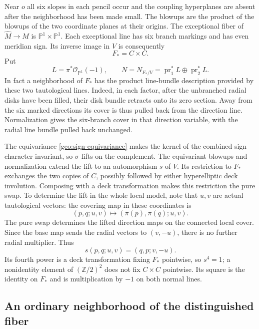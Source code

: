 \documentclass[11pt,reqno]{amsart}
\numberwithin{equation}{section}
\theoremstyle{definition}
\theoremstyle{remark}
\newcommand{\Z}{\mathbb Z}
\newcommand{\PP}{\mathbb P}
\begin{document}
Near $o$ all six slopes in each pencil occur and the coupling
hyperplanes are absent after the neighborhood has been made small.
The blowups are the product of the blowups of the two coordinate
planes at their origins.  The exceptional fiber of $\widehat M\to M$
is $\PP^1\times\PP^1$.  Each exceptional line has six branch markings
and has even meridian sign.  Its inverse image in $V$ is consequently
\begin{equation}\label{geo:Fstar}
                            F_*=C\times C.
\end{equation}
Put
\[
       L=\pi^*\mathcal O_{\PP^1}(-1),
       \qquad N=N_{F_*/V}
          =\operatorname{pr}_1^*L\oplus\operatorname{pr}_2^*L.
\]
In fact a neighborhood of $F_*$ has the product line-bundle description
provided by these two tautological lines.  Indeed, in each factor, after
the unbranched radial disks have been filled, their disk bundle retracts onto its
zero section.  Away from the six marked directions its cover is thus
pulled back from the direction line.  Normalization gives the
six-branch cover in that direction variable, with the radial line
bundle pulled back unchanged.

The equivariance \eqref{geo:sign-equivariance} makes the kernel of the
combined sign character invariant, so $\sigma$ lifts on the complement.
The equivariant blowups and normalization extend the lift to an
automorphism $s$ of $V$.  Its restriction to $F_*$ exchanges the two
copies of $C$, possibly followed by either hyperelliptic deck
involution.  Composing with a deck transformation makes this
restriction the pure swap.  To determine the lift in the whole local
model, note that $u,v$ are actual tautological vectors: the covering
map in these coordinates is
\[
 (p,q;u,v)\longmapsto(\pi(p),\pi(q);u,v).
\]
The pure swap determines the lifted direction maps on the connected
local cover.  Since the base map sends the radial vectors to $(v,-u)$,
there is no further radial multiplier.  Thus
\begin{equation}\label{geo:line-action}
             s(p,q;u,v)=(q,p;v,-u).
\end{equation}
Its fourth power is a deck transformation fixing $F_*$ pointwise,
so $s^4=1$; a nonidentity element of $(\Z/2)^2$ does not fix $C\times C$
pointwise.  Its square is the identity on $F_*$ and is multiplication
by $-1$ on both normal lines.

\subsection{An ordinary neighborhood of the distinguished fiber}
\label{geo:resolution}
\end{document}
